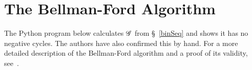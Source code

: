 {\Appendix
\section{The Bellman-Ford Algorithm} \label{bfAlg}
The Python program below calculates $\mathscr{G}$ from \S~\ref{binSeq} and shows it has
no negative cycles. The authors have also confirmed this by hand. For a more
detailed description of the Bellman-Ford algorithm and a proof of its validity,
see~\cite{bellmanford}.\\

\footnotesize

\normalsize
}

